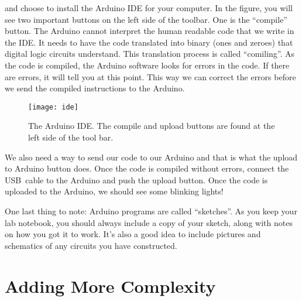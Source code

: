 \noindent and choose to install the Arduino IDE for your computer. 
In the figure, you will see two important buttons on the left side of the 
toolbar. One is the ``compile'' button. The Arduino cannot interpret the 
human readable code that we write in the IDE. It needs to have the code 
translated into binary (ones and zeroes) that digital logic circuits understand.
This translation process is called ``comiling''. As the code is compiled, the
Arduino software looks for errors in the code. If there are errors, it will
tell you at this point. This way we can correct the errors before we send 
the compiled instructions to the Arduino.
\begin{figure}[hbp!]
\centering
\texttt{[image: ide]}
\caption[The Arduino IDE]{The Arduino IDE. The compile and upload buttons are
found at the left side of the tool bar.}
\label{fig:ide}
\end{figure}

We also need a way to send our code to our Arduino and that is what the
upload to Arduino button does. Once the code is compiled without errors,
connect the USB\ cable to the Arduino and push the upload button. Once the 
code is uploaded to the Arduino, we should see some blinking lights!

One last thing to note: Arduino programs are called ``sketches''. As you 
keep your lab notebook, you should always include a copy of your sketch, along
with notes on how you got it to work. It's also a good idea to include 
pictures and schematics of any circuits you have constructed.



\section{Adding More Complexity}

